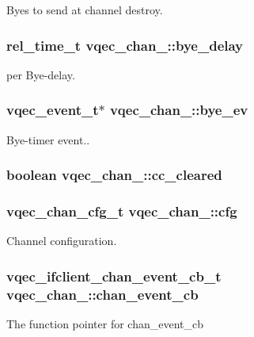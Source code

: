 Byes to send at channel destroy. 
\subsubsection{\setlength{\rightskip}{0pt plus 5cm}rel\_\-time\_\-t \bf{vqec\_\-chan\_\-::bye\_\-delay}}\label{structvqec__chan___d135e71b49d6f9afca6aea7c6d2583b4}


per Bye-delay. 
\subsubsection{\setlength{\rightskip}{0pt plus 5cm}vqec\_\-event\_\-t$\ast$ \bf{vqec\_\-chan\_\-::bye\_\-ev}}\label{structvqec__chan___d49e0c664f4a7a262fea7ccf36adf9ee}


Bye-timer event.. 
\subsubsection{\setlength{\rightskip}{0pt plus 5cm}boolean \bf{vqec\_\-chan\_\-::cc\_\-cleared}}\label{structvqec__chan___bfef00e21ff13991c3d885ba1e987d8a}


\subsubsection{\setlength{\rightskip}{0pt plus 5cm}\bf{vqec\_\-chan\_\-cfg\_\-t} \bf{vqec\_\-chan\_\-::cfg}}\label{structvqec__chan___37f638600fc933857a55acd0f91f2488}


Channel configuration. 
\subsubsection{\setlength{\rightskip}{0pt plus 5cm}\bf{vqec\_\-ifclient\_\-chan\_\-event\_\-cb\_\-t} \bf{vqec\_\-chan\_\-::chan\_\-event\_\-cb}}\label{structvqec__chan___022a433e13f9af1a0ffd381c1739e664}


The function pointer for chan\_\-event\_\-cb 

